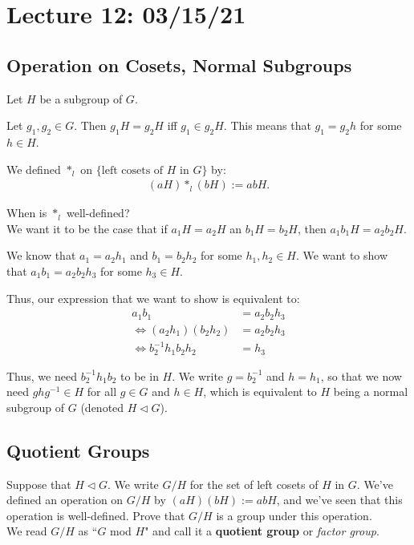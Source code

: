 \section{Lecture 12: 03/15/21}

\subsection{Operation on Cosets, Normal Subgroups}

Let $H$ be a subgroup of $G$.

\begin{lemma}
Let $g_1, g_2 \in G$. Then $g_1H = g_2H$ iff $g_1 \in g_2H$. This means that $g_1 = g_2 h$ for some $h \in H$.
\end{lemma}

\begin{definition}
We defined $*_l$ on $\{\text{left cosets of $H$ in $G$}\}$ by:
\begin{align*}
    (aH) *_l (bH) := abH.
\end{align*}
\end{definition}

When is $*_l$ well-defined?\\

We want it to be the case that if $a_1H = a_2H$ an $b_1H = b_2H$, then $a_1b_1H = a_2b_2H$.

We know that $a_1 = a_2h_1$ and $b_1 = b_2h_2$ for some $h_1, h_2 \in H$. We want to show that $a_1b_1 = a_2b_2h_3$ for some $h_3 \in H$.

Thus, our expression that we want to show is equivalent to:
\begin{align*}
    a_1b_1 &= a_2b_2h_3 \\
    \iff (a_2h_1)(b_2h_2) &= a_2b_2h_3 \\
    \iff b_2^{-1}h_1b_2h_2 &= h_3
\end{align*}

Thus, we need $b_2^{-1}h_1b_2$ to be in $H$. We write $g = b_2^{-1}$ and $h = h_1$, so that we now need $ghg^{-1} \in H$ for all $g \in G$ and $h \in H$, which is equivalent to $H$ being a normal subgroup of $G$ (denoted $H \triangleleft G$).

\subsection{Quotient Groups}

\begin{proposition}
Suppose that $H \triangleleft G$. We write $G/H$ for the set of left cosets of $H$ in $G$. We've defined an operation on $G/H$ by $(aH)(bH) := abH$, and we've seen that this operation is well-defined. Prove that $G/H$ is a group under this operation.\\

We read $G/H$ as ``$G$ mod $H$" and call it a \textbf{quotient group} or \textit{factor group}.
\end{proposition}

